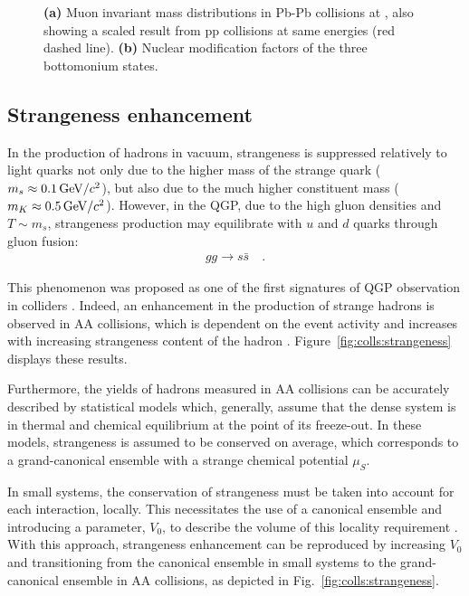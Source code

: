 \begin{figure}[H]
\hspace{2em} 
\caption{\textbf{(a)} Muon invariant mass distributions in Pb-Pb collisions at , also showing a scaled result from pp collisions at same energies (red dashed line). \textbf{(b)} Nuclear modification factors of the three bottomonium states. \cite{cmscollaborationMeasurementNuclearModification2019}}
\label{fig:colls:cmsupsilon}
\end{figure}

\subsection{Strangeness enhancement}

In the production of hadrons in vacuum, strangeness is suppressed relatively to light quarks not only due to the higher mass of the strange quark ($m_s \approx 0.1 \text{\,GeV/$c^2$}$), but also due to the much higher constituent mass ($m_K \approx 0.5 \text{\,GeV/$c^2$}$). However, in the QGP, due to the high gluon densities and $T\sim m_s$, strangeness production may equilibrate with $u$ and $d$ quarks through gluon fusion:
\begin{align*}
gg \to s\bar{s} \quad .
\end{align*}

This phenomenon was proposed as one of the first signatures of QGP observation in colliders \cite{rafelskiStrangenessProductionQuarkGluon1982, kochStrangenessRelativisticHeavy1986}. Indeed, an enhancement in the production of strange hadrons is observed in AA collisions, which is dependent on the event activity and increases with increasing strangeness content of the hadron \cite{alicecollaborationMultistrangeBaryonProduction2016}. Figure~\ref{fig:colls:strangeness} displays these results.

Furthermore, the yields of hadrons measured in AA collisions can be accurately described by statistical models \cite{andronicThermalHadronProduction2009, wheatonTHERMUSThermalModel2009} which, generally, assume that the dense system is in thermal and chemical equilibrium at the point of its freeze-out. In these models, strangeness is assumed to be conserved on average, which corresponds to a grand-canonical ensemble with a strange chemical potential $\mu_S$. 

In small systems, the conservation of strangeness must be taken into account for each interaction, locally. This necessitates the use of a canonical ensemble and introducing a parameter, $V_0$, to describe the volume of this locality requirement \cite{hamiehCanonicalDescriptionStrangeness2000}. With this approach, strangeness enhancement can be reproduced by increasing $V_0$ and transitioning from the canonical ensemble in small systems to the grand-canonical ensemble in AA collisions, as depicted in Fig.~\ref{fig:colls:strangeness}.

